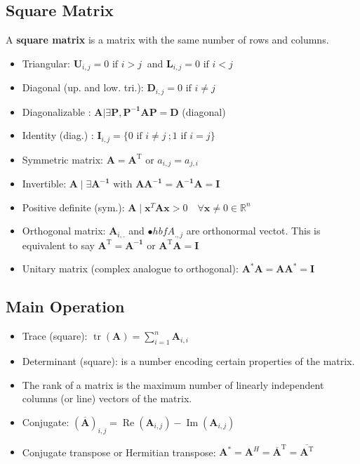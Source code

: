 \documentclass[twocolumn]{article}
\numberwithin{equation}{section}
\begin{document}
	\subsection{Square Matrix}
A \textbf{square matrix} is a matrix with the same number of rows and columns.	
\begin{itemize}    
	\item Triangular: $\mathbf{U}_{i,j} = 0 \mbox{ if } i > j\ $ and  $\mathbf{L}_{i,j} = 0 \mbox{ if } i < j\ $
	\item Diagonal (up. and low. tri.): $\mathbf{D}_{i,j} = 0 \mbox{ if } i \ne j\ $
	\item Diagonalizable : $\mathbf{A | \exists P, P^{-1}AP=D} $ (diagonal)
	\item Identity (diag.) : $\mathbf{I}_{i,j} = \{0 \mbox{ if } i \ne j\ ; 1 \mbox{ if } i=j \} $
 	\item Symmetric matrix: $\mathbf{A} = \mathbf{A}^{\mathrm{T}} \mbox{ or } a_{i,j}=a_{j,i}$
 	\item Invertible: $\mathbf{A} \mid \exists \mathbf{A^{-1}} \mbox{ with }\mathbf{AA^{-1}} = \mathbf{A^{-1}A} = \mathbf{I}$
	\item Positive definite (sym.): $\mathbf{A} \mid \mathbf{x}^T\mathbf{A}\mathbf{x} > 0 \quad \forall \mathbf{x}\not=0 \in \mathbb{R}^n$
	\item Orthogonal matrix: $\mathbf{A}_{i,.}$ and $\mathbf{•}hbf{A}_{.,j}$ are orthonormal vectot. This is equivalent to say $\mathbf{A^\mathrm{T}}=\mathbf{A^{-1}}$ or $\mathbf{A^\mathrm{T}}\mathbf{A}=\mathbf{I}$
	\item Unitary matrix (complex analogue to orthogonal): $\mathbf{A}^* \mathbf{A} = \mathbf{A}\mathbf{A}^* = \mathbf{I} $
\end{itemize}


	\subsection{Main Operation}
\begin{itemize}
	\item Trace (square): $\operatorname{tr}(\mathbf{A}) = \sum_{i=1}^{n} \mathbf{A}_{i,i}$
	\item Determinant (square):  is a number encoding certain properties of the matrix.
	\item The rank of a matrix is the maximum number of linearly independent columns (or line) vectors of the matrix.
	\item Conjugate: $(\overline{\mathbf{A}})_{i,j}=\operatorname{Re}(\mathbf{A}_{i,j}) - \operatorname{Im}(\mathbf{A}_{i,j})$
	\item Conjugate transpose or Hermitian transpose: $\boldsymbol{A}^* = \boldsymbol{A}^H = \overline{\boldsymbol{A}}^\mathrm{T} = \overline{\boldsymbol{A}^\mathrm{T}}$
\end{itemize}	
\end{document}
